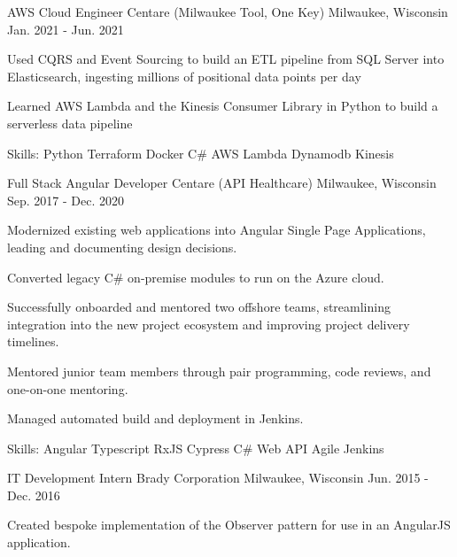 \begin{cventries}
  \cventry
 {AWS Cloud Engineer} %
 {Centare (Milwaukee Tool, One Key)} %
 {Milwaukee, Wisconsin} %
 {Jan. 2021 - Jun. 2021} %
 {
      \begin{cvitems} %
        \item {Used CQRS and Event Sourcing to build an ETL pipeline from SQL Server into Elasticsearch, ingesting millions of positional data points per day }
        \item {Learned AWS Lambda and the Kinesis Consumer Library in Python to build a serverless data pipeline}
        \item {Skills: Python \textbullet{} Terraform \textbullet{} Docker \textbullet{} C\# \textbullet{} AWS Lambda \textbullet{} Dynamodb \textbullet{} Kinesis}
      \end{cvitems}
 }

  \cventry
 {Full Stack Angular Developer} %
 {Centare (API Healthcare)} %
 {Milwaukee, Wisconsin} %
 {Sep. 2017 - Dec. 2020} %
 {
      \begin{cvitems} %
        \item {Modernized existing web applications into Angular Single Page Applications, leading and documenting design decisions.}
        \item {Converted legacy C\# on-premise modules to run on the Azure cloud.}
        \item {Successfully onboarded and mentored two offshore teams, streamlining integration into the new project ecosystem and improving project delivery timelines.}
        \item {Mentored junior team members through pair programming, code reviews, and one-on-one mentoring.}
        \item {Managed automated build and deployment in Jenkins.}
        \item {Skills: Angular \textbullet{} Typescript \textbullet{} RxJS \textbullet{} Cypress \textbullet{} C\# Web API \textbullet{} Agile \textbullet{} Jenkins}
      \end{cvitems}
 }

  \cventry
 {IT Development Intern} %
 {Brady Corporation} %
 {Milwaukee, Wisconsin} %
 {Jun. 2015 - Dec. 2016} %
 {
      \begin{cvitems} %
        \item {Created bespoke implementation of the Observer pattern for use in an AngularJS application.}
      \end{cvitems}
 }


\end{cventries}
